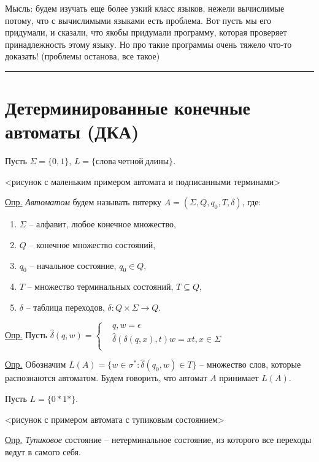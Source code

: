 \documentclass[fleqn, 12pt]{article}
\newcommand{\dand}[2]{\left\{\begin{aligned}&#1\\&#2\\\end{aligned}\right.}
\begin{document}
Мысль: будем изучать еще более узкий класс языков, нежели вычислимые потому, что с вычислимыми языками есть проблема. Вот пусть мы его придумали, и сказали, что якобы придумали программу, которая проверяет принадлежность этому языку. Но про такие программы очень тяжело что-то доказать! (проблемы останова, все такое)



\bigskip
\hrule
\bigskip
\section{Детерминированные конечные автоматы (ДКА)}

Пусть $ \Sigma = \{0, 1\} $, $ L = \{слова\ четной\ длины \} $.

<рисунок с маленьким примером автомата и подписанными терминами>

\underline{Опр.} \textit{Автоматом} будем называть пятерку $ A = (\Sigma, Q, q_0, T, \delta) $, где:

\begin{enumerate}
	\item $ \Sigma $ -- алфавит, любое конечное множество,
	
	\item $ Q $ -- конечное множество состояний,
	
	\item $ q_0 $ -- начальное состояние, $ q_0 \in Q $,
	
	\item $ T $ -- множество терминальных состояний, $ T \subseteq Q $,
	
	\item $ \delta $ -- таблица переходов, $ \delta \colon Q \times \Sigma \to Q $.
\end{enumerate}

\underline{Опр.} Пусть $ \hat{\delta} (q, w) = \dand{q, w = \epsilon}{\hat{\delta}(\delta(q, x), t) w=xt, x \in \Sigma} $

\underline{Опр.} Обозначим $ L(A) = \{ w \in \sigma^* \colon \hat{\delta}(q_0, w) \in T \} $ -- множество слов, которые распознаются автоматом. Будем говорить, что автомат $ A $ принимает $ L(A) $.


\bigskip


Пусть $ L = \{0*1*\} $. 

<рисунок с примером автомата с тупиковым состоянием>

\underline{Опр.} \textit{Тупиковое} состояние -- нетерминальное состояние, из которого все переходы ведут в самого себя. 
\end{document}
